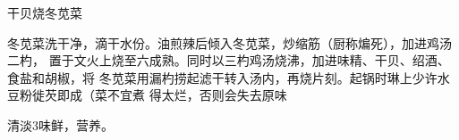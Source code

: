 \begin{recipe}{干贝烧冬苋菜}

\ingredients


\cooking

冬苋菜洗干净，滴干水份。油煎辣后倾入冬苋菜，炒缩筋（厨称煸死），加进鸡汤二杓，
置于文火上烧至六成熟。同时以三杓鸡汤烧沸，加进味精、干贝、绍酒、食盐和胡椒，将
冬苋菜用漏杓捞起滤干转入汤内，再烧片刻。起锅时琳上少许水豆粉徙芡即成（菜不宜煮
得太烂，否则会失去原味

\features

清淡3味鲜，营养。

\end{recipe}

